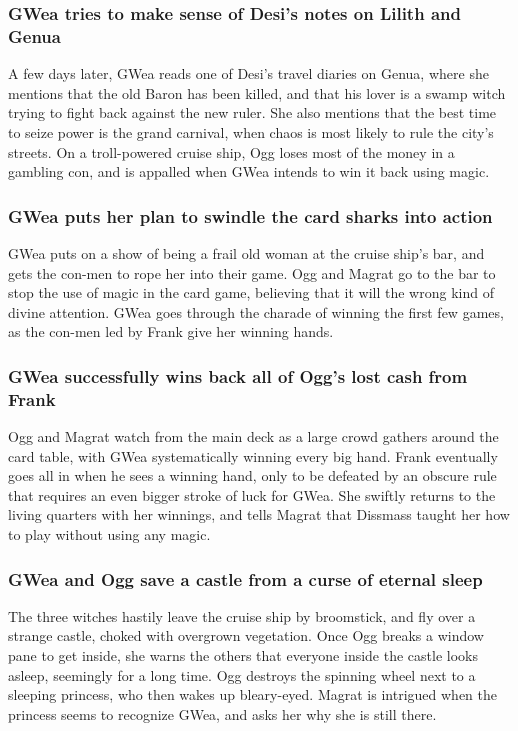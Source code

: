 \subsubsection{\Gls{GWea} tries to make sense of \Gls{Desi}'s notes on \Gls{Lilith} and Genua}
A few days later, \Gls{GWea} reads one of \Gls{Desi}'s travel diaries on Genua, where she mentions
that the old Baron has been killed, and that his lover is a swamp witch trying to fight back against
the new ruler. She also mentions that the best time to seize power is the grand carnival, when chaos
is most likely to rule the city's streets. On a troll-powered cruise ship, \Gls{Ogg} loses most of
the money in a gambling con, and is appalled when \Gls{GWea} intends to win it back using magic.

\subsubsection{\Gls{GWea} puts her plan to swindle the card sharks into action}
\Gls{GWea} puts on a show of being a frail old woman at the cruise ship's bar, and gets the con-men
to rope her into their game. \Gls{Ogg} and \Gls{Magrat} go to the bar to stop the use of magic in
the card game, believing that it will the wrong kind of divine attention. \Gls{GWea} goes through
the charade of winning the first few games, as the con-men led by \Gls{Frank} give her winning
hands.

\subsubsection{\Gls{GWea} successfully wins back all of \Gls{Ogg}'s lost cash from \Gls{Frank}}
\Gls{Ogg} and \Gls{Magrat} watch from the main deck as a large crowd gathers around the card table,
with \Gls{GWea} systematically winning every big hand. \Gls{Frank} eventually goes all in when he
sees a winning hand, only to be defeated by an obscure rule that requires an even bigger stroke of
luck for \Gls{GWea}. She swiftly returns to the living quarters with her winnings, and tells
\Gls{Magrat} that \Gls{Dissmass} taught her how to play without using any magic.

\subsubsection{\Gls{GWea} and \Gls{Ogg} save a castle from a curse of eternal sleep}
The three witches hastily leave the cruise ship by broomstick, and fly over a strange castle, choked
with overgrown vegetation. Once \Gls{Ogg} breaks a window pane to get inside, she warns the others
that everyone inside the castle looks asleep, seemingly for a long time. \Gls{Ogg} destroys the
spinning wheel next to a sleeping princess, who then wakes up bleary-eyed. \Gls{Magrat} is intrigued
when the princess seems to recognize \Gls{GWea}, and asks her why she is still there.

